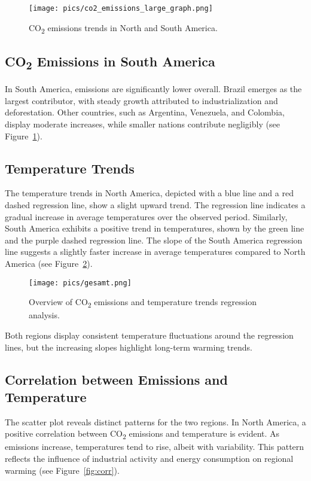 \documentclass[a4paper,12pt]{article}
\begin{document}
\begin{figure}[htbp]
    \centering
    \texttt{[image: pics/co2\_emissions\_large\_graph.png]} 
    \caption{CO\textsubscript{2} emissions trends in North and South America.}
    \label{fig:co2-emissions}
\end{figure}

\subsection{CO\textsubscript{2} Emissions in South America}
In South America, emissions are significantly lower overall. Brazil emerges as the largest contributor, with steady growth attributed to industrialization and deforestation. Other countries, such as Argentina, Venezuela, and Colombia, display moderate increases, while smaller nations contribute negligibly (see Figure~\ref{fig:co2-emissions}).

\bigskip

\subsection{Temperature Trends}
The temperature trends in North America, depicted with a blue line and a red dashed regression line, show a slight upward trend. The regression line indicates a gradual increase in average temperatures over the observed period. Similarly, South America exhibits a positive trend in temperatures, shown by the green line and the purple dashed regression line. The slope of the South America regression line suggests a slightly faster increase in average temperatures compared to North America (see Figure~\ref{fig:regression-overview}).

\begin{figure}[htbp]
    \centering
    \texttt{[image: pics/gesamt.png]} 
    \caption{Overview of CO\textsubscript{2} emissions and temperature trends regression analysis.}
    \label{fig:regression-overview}
\end{figure}

\noindent
Both regions display consistent temperature fluctuations around the regression lines, but the increasing slopes highlight long-term warming trends.

\subsection{Correlation between Emissions and Temperature}
The scatter plot reveals distinct patterns for the two regions. In North America, a positive correlation between CO\textsubscript{2} emissions and temperature is evident. As emissions increase, temperatures tend to rise, albeit with variability. This pattern reflects the influence of industrial activity and energy consumption on regional warming (see Figure~\ref{fig:corr}).
\end{document}
